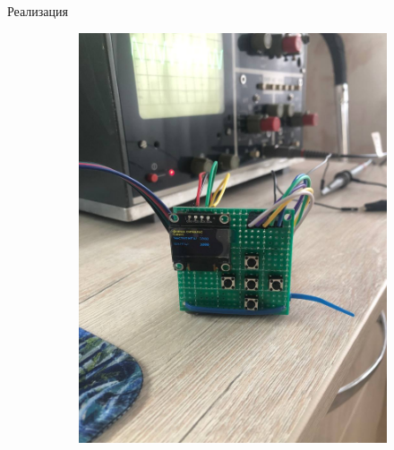 \documentclass[10pt]{beamer}
\begin{document}
\begin{frame}{Реализация}
\begin{figure}
     \begin{subfigure}[H]{0.45\textwidth}
         \centering
         \includegraphics[width=\textwidth]{1}
     \end{subfigure}
     \hfill
     \begin{subfigure}[H]{0.45\textwidth}
         \centering

\end{subfigure}
\end{figure}
\end{frame}
\end{document}
